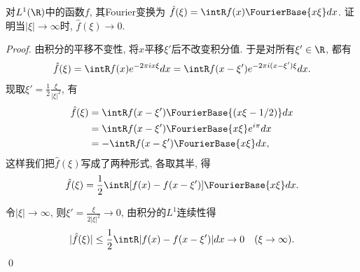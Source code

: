 \begin{example}[~(黎曼-勒贝格引理)]
    对$L^1(\R)$中的函数$f$, 其Fourier变换为
    $\hat{f}(\xi) = \intR f(x)\FourierBase{x\xi}dx$.
    证明当$|\xi| \to \infty$时, $\hat{f}(\xi) \to 0$.
\end{example}
\begin{proof}

    由积分的平移不变性, 将$x$平移$\xi'$后不改变积分值. 于是对所有$\xi' \in \R$, 都有 
    $$\hat{f}(\xi) = \intR f(x)e^{-2\pi ix\xi}dx 
    = \intR f(x-\xi')e^{-2\pi i(x-\xi')\xi}dx.$$
    现取$\xi' = \frac{1}{2}\frac{\xi}{|\xi|^2}$, 有
    \begin{align*}
    \hat{f}(\xi) &= \intR f(x-\xi')\FourierBase{(x\xi - 1/2)}dx \\
    &= \intR f(x-\xi')\FourierBase{x\xi}e^{i\pi}dx \\
    &= -\intR f(x-\xi')\FourierBase{x\xi}dx, 
    \end{align*}
    这样我们把$\hat{f}(\xi)$写成了两种形式, 各取其半, 得 
    $$\hat{f}(\xi) = \frac{1}{2} \intR[f(x)-f(x-\xi')]\FourierBase{x\xi}dx.$$
    
    令$|\xi| \to \infty$, 则$\xi' = \frac{\xi}{2|\xi|^2} \to 0$,
    由积分的$L^1$连续性得
    $$|\hat{f}(\xi)| \leq \frac{1}{2}
     \intR|f(x)-f(x-\xi')|dx\to 0 \quad (\xi \to \infty).$$ \qed 
\end{proof}


